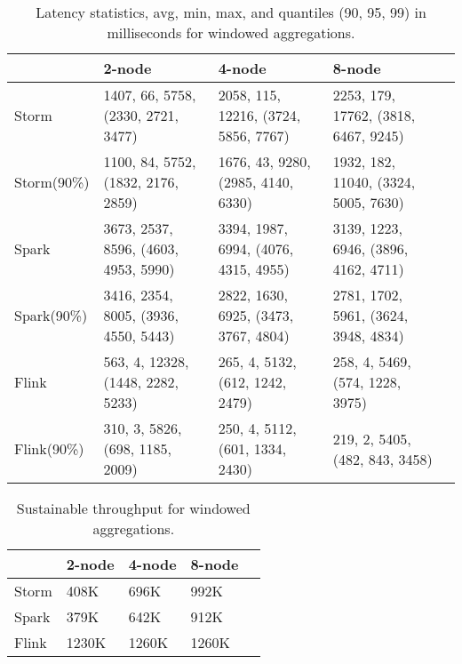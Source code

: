     \begin{table*}
        \resizebox{\textwidth}{!} {\begin{tabular}{lllll}\toprule
            &\textbf{2-node}  & \textbf{4-node} & \textbf{8-node}\\\midrule
            Storm & 1407, 66, 5758, (2330, 2721, 3477) & 2058, 115, 12216, (3724, 5856, 7767) & 2253, 179, 17762, (3818, 6467, 9245) \\
            Storm(90\%) & 1100, 84, 5752, (1832, 2176, 2859) & 1676, 43, 9280, (2985, 4140, 6330) & 1932, 182, 11040, (3324, 5005, 7630) \\
            Spark & 3673, 2537, 8596, (4603, 4953, 5990) & 3394, 1987, 6994, (4076, 4315, 4955) & 3139, 1223, 6946, (3896, 4162, 4711)\\
            Spark(90\%) & 3416, 2354, 8005, (3936, 4550, 5443) & 2822, 1630, 6925, (3473, 3767, 4804) & 2781, 1702, 5961, (3624, 3948, 4834)\\
            Flink & 563, 4, 12328, (1448, 2282, 5233) & 265, 4, 5132, (612, 1242, 2479) & 258, 4, 5469, (574, 1228, 3975) \\
            Flink(90\%) & 310, 3, 5826, (698, 1185, 2009) & 250, 4, 5112, (601, 1334, 2430)  & 219, 2, 5405, (482, 843, 3458) \\
        \end{tabular}}
        \caption{ Latency statistics, avg, min, max, and quantiles (90, 95, 99) in milliseconds for windowed aggregations. }
         \label{tab_lat_agg}
    \end{table*} 



    \begin{table}
        \begin{tabular}{lllll}\toprule
            &\textbf{2-node}  & \textbf{4-node} & \textbf{8-node}\\\midrule
            Storm & 408K & 696K & 992K  \\
            Spark & 379K & 642K & 912K  \\
            Flink & 1230K & 1260K & 1260K  \\
        \end{tabular}
        \caption{Sustainable throughput for windowed aggregations. }
        \label{tab_th_agg}
    \end{table} 


%

